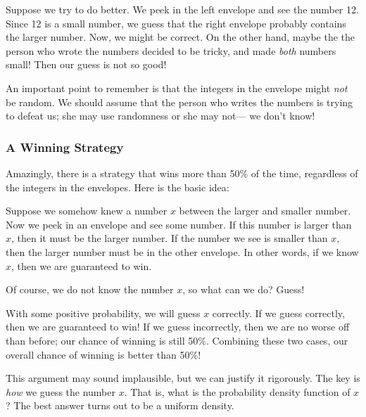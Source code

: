 \documentclass[11pt,twoside]{article}
\begin{document}
Suppose we try to do better.  We peek in the left envelope and see the
number 12.  Since 12 is a small number, we guess that the right envelope
probably contains the larger number.  Now, we might be correct.  On the
other hand, maybe the the person who wrote the numbers decided to be
tricky, and made \emph{both} numbers small!  Then our guess is not so
good!

An important point to remember is that the integers in the envelope might
\emph{not} be random.  We should assume that the person who writes the
numbers is trying to defeat us; she may use randomness or she may not---
we don't know!

\subsubsection{A Winning Strategy}

Amazingly, there is a strategy that wins more than 50\% of the time,
regardless of the integers in the envelopes.
Here is the basic idea:

Suppose we somehow knew a number $x$ between the larger and smaller
number.  Now we peek in an envelope and see some number.  If this
number is larger than $x$, then it must be the larger number.  If the
number we see is smaller than $x$, then the larger number must be in
the other envelope.  In other words, if we know $x$, then we are
guaranteed to win.

Of course, we do not know the number $x$, so what can we do?  Guess!

With some positive probability, we will guess $x$ correctly.  If we
guess correctly, then we are guaranteed to win!  If we guess
incorrectly, then we are no worse off than before; our chance of
winning is still 50\%.  Combining these two cases, our overall chance
of winning is better than 50\%!

This argument may sound implausible, but we can justify it rigorously.
The key is \emph{how} we guess the number $x$.  That is, what is the
probability density function of $x$?  The best answer turns out to be a
uniform density.
\end{document}
